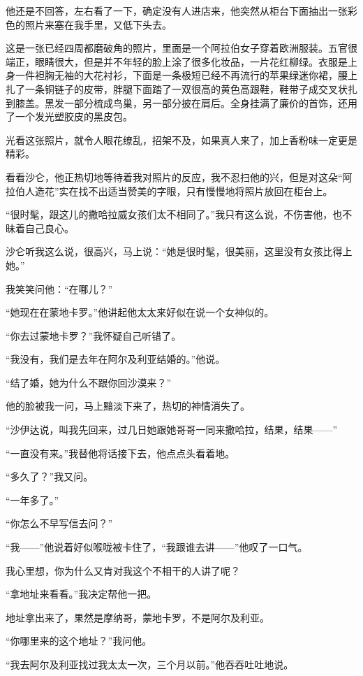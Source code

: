 \par 他还是不回答，左右看了一下，确定没有人进店来，他突然从柜台下面抽出一张彩色的照片来塞在我手里，又低下头去。
\par 这是一张已经四周都磨破角的照片，里面是一个阿拉伯女子穿着欧洲服装。五官很端正，眼睛很大，但是并不年轻的脸上涂了很多化妆品，一片花红柳绿。衣服是上身一件袒胸无袖的大花衬衫，下面是一条极短已经不再流行的苹果绿迷你裙，腰上扎了一条铜链子的皮带，胖腿下面踏了一双很高的黄色高跟鞋，鞋带子成交叉状扎到膝盖。黑发一部分梳成鸟巢，另一部分披在肩后。全身挂满了廉价的首饰，还用了一个发光塑胶皮的黑皮包。
\par 光看这张照片，就令人眼花缭乱，招架不及，如果真人来了，加上香粉味一定更是精彩。
\par 看看沙仑，他正热切地等待着我对照片的反应，我不忍扫他的兴，但是对这朵“阿拉伯人造花”实在找不出适当赞美的字眼，只有慢慢地将照片放回在柜台上。
\par “很时髦，跟这儿的撒哈拉威女孩们太不相同了。”我只有这么说，不伤害他，也不昧着自己良心。
\par 沙仑听我这么说，很高兴，马上说：“她是很时髦，很美丽，这里没有女孩比得上她。”
\par 我笑笑问他：“在哪儿？”
\par “她现在在蒙地卡罗。”他讲起他太太来好似在说一个女神似的。
\par “你去过蒙地卡罗？”我怀疑自己听错了。
\par “我没有，我们是去年在阿尔及利亚结婚的。”他说。
\par “结了婚，她为什么不跟你回沙漠来？”
\par 他的脸被我一问，马上黯淡下来了，热切的神情消失了。
\par “沙伊达说，叫我先回来，过几日她跟她哥哥一同来撒哈拉，结果，结果——”
\par “一直没有来。”我替他将话接下去，他点点头看着地。
\par “多久了？”我又问。
\par “一年多了。”
\par “你怎么不早写信去问？”
\par “我——”他说着好似喉咙被卡住了，“我跟谁去讲——”他叹了一口气。
\par 我心里想，你为什么又肯对我这个不相干的人讲了呢？
\par “拿地址来看看。”我决定帮他一把。
\par 地址拿出来了，果然是摩纳哥，蒙地卡罗，不是阿尔及利亚。
\par “你哪里来的这个地址？”我问他。
\par “我去阿尔及利亚找过我太太一次，三个月以前。”他吞吞吐吐地说。
